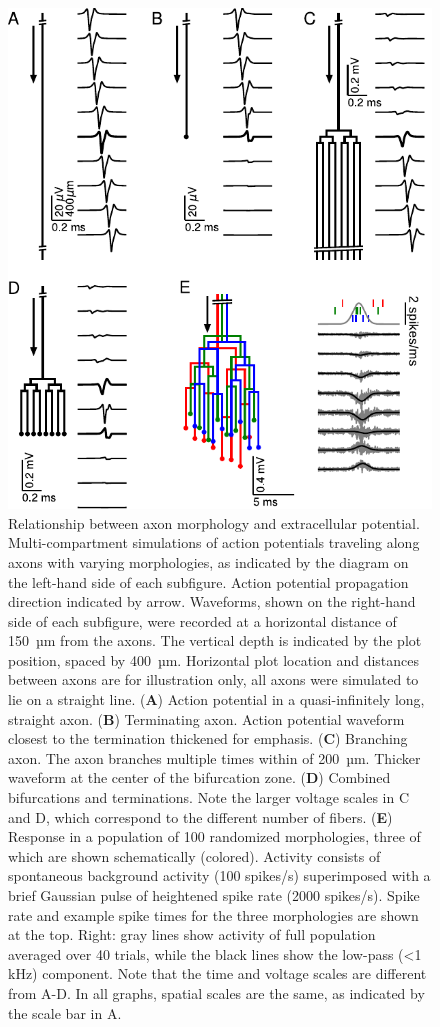 \documentclass[]{elife}
\begin{document}
\begin{figure}[htbp]
\centering
\includegraphics{figs/fig_1_nocsd.pdf}
\caption{\label{fig:simpletree}Relationship between axon morphology and
extracellular potential. Multi-compartment simulations of action
potentials traveling along axons with varying morphologies, as indicated
by the diagram on the left-hand side of each subfigure. Action potential
propagation direction indicated by arrow. Waveforms, shown on the
right-hand side of each subfigure, were recorded at a horizontal
distance of 150~µm from the axons. The vertical depth is indicated by
the plot position, spaced by 400~µm. Horizontal plot location and
distances between axons are for illustration only, all axons were
simulated to lie on a straight line. (\textbf{A}) Action potential in a
quasi-infinitely long, straight axon. (\textbf{B}) Terminating axon.
Action potential waveform closest to the termination thickened for
emphasis. (\textbf{C}) Branching axon. The axon branches multiple times
within of 200~µm. Thicker waveform at the center of the bifurcation
zone. (\textbf{D}) Combined bifurcations and terminations. Note the
larger voltage scales in C and D, which correspond to the different
number of fibers. (\textbf{E}) Response in a population of 100
randomized morphologies, three of which are shown schematically
(colored). Activity consists of spontaneous background activity (100
spikes/s) superimposed with a brief Gaussian pulse of heightened spike
rate (2000 spikes/s). Spike rate and example spike times for the three
morphologies are shown at the top. Right: gray lines show activity of
full population averaged over 40 trials, while the black lines show the
low-pass (\textless{}1 kHz) component. Note that the time and voltage
scales are different from A-D. In all graphs, spatial scales are the
same, as indicated by the scale bar in A.}
\end{figure}
\end{document}
